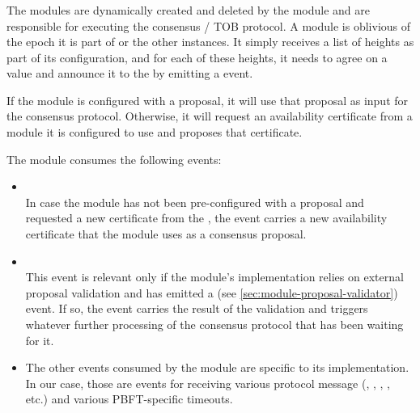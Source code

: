 \documentclass{article}
\begin{document}
\subsubsection{}

The  modules are dynamically created and deleted by the  module
and are responsible for executing the consensus / TOB protocol.
A  module is oblivious of the epoch it is part of or the other  instances.
It simply receives a list of heights as part of its configuration,
and for each of these heights, it needs to agree on a value and announce it to the  by emitting a  event.

If the  module is configured with a proposal, it will use that proposal as input for the consensus protocol.
Otherwise, it will request an availability certificate from a  module it is configured to use
and proposes that certificate.

The  module consumes the following events:
\begin{itemize}

    \item {}\\
    In case the  module has not been pre-configured with a proposal
    and requested a new certificate from the ,
    the  event carries a new availability certificate
    that the  module uses as a consensus proposal.

    \item {}\\
    This event is relevant only if the  module's implementation relies on external proposal validation
    and has emitted a  (see \cref{sec:module-proposal-validator}) event.
    If so, the  event carries the result of the validation
    and triggers whatever further processing of the consensus protocol that has been waiting for it.

    \item The other events consumed by the  module are specific to its implementation.
    In our case, those are events for receiving various protocol message
    (, , , , etc.) and various PBFT-specific timeouts.

\end{itemize}
\end{document}
